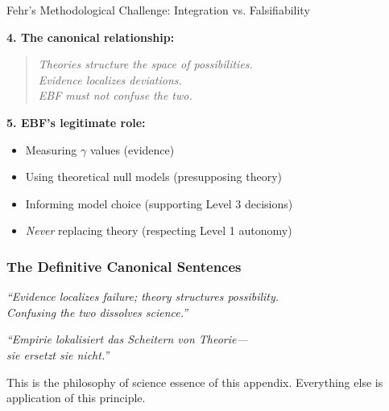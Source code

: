 \begin{chapter}{Fehr's Methodological Challenge: Integration vs. Falsifiability}
\begin{tcolorbox}[colback=blue!5!white,colframe=blue!75!black,title=\textbf{The Complete Philosophy of Science Position}]
\textbf{4. The canonical relationship:}
\begin{quote}
\textit{Theories structure the space of possibilities.\\
Evidence localizes deviations.\\
EBF must not confuse the two.}
\end{quote}

\textbf{5. EBF's legitimate role:}
\begin{itemize}[noitemsep]
    \item Measuring $\gamma$ values (evidence)
    \item Using theoretical null models (presupposing theory)
    \item Informing model choice (supporting Level 3 decisions)
    \item \textit{Never} replacing theory (respecting Level 1 autonomy)
\end{itemize}

\end{tcolorbox}

\subsubsection{The Definitive Canonical Sentences}

\begin{tcolorbox}[colback=red!5!white,colframe=red!75!black,title=\textbf{Canonical Formulation (English)}]
\begin{center}
\Large
\textit{``Evidence localizes failure; theory structures possibility.\\
Confusing the two dissolves science.''}
\end{center}
\end{tcolorbox}

\begin{tcolorbox}[colback=red!5!white,colframe=red!75!black,title=\textbf{Kanonische Formulierung (Deutsch)}]
\begin{center}
\Large
\textit{``Empirie lokalisiert das Scheitern von Theorie---\\
sie ersetzt sie nicht.''}
\end{center}
\end{tcolorbox}

This is the philosophy of science essence of this appendix. Everything else is application of this principle.



\end{chapter}
